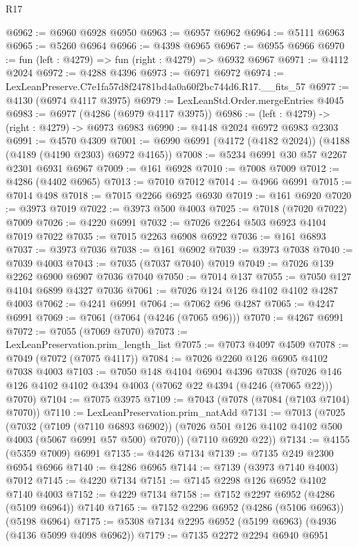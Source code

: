 \begin{lexlean}{R17}
\begin{coremodule}
@6962 := @6960 @6928 @6950
@6963 := @6957 @6962
@6964 := @5111 @6963
@6965 := @5260 @6964
@6966 := @4398 @6965
@6967 := @6955 @6966
@6970 := fun (left : @4279) => fun (right : @4279) => @6932 @6967
@6971 := @4112 @2024
@6972 := @4288 @4396
@6973 := @6971 @6972
@6974 := LexLeanPreserve.C7e1fa57d8f24781bd4a0a60f2bc744d6.R17.__fits_57
@6977 := @4130 (@6974 @4117 @3975)
@6979 := LexLeanStd.Order.mergeEntries @4045
@6983 := @6977 (@4286 (@6979 @4117 @3975))
@6986 := (left : @4279) -> (right : @4279) -> @6973 @6983
@6990 := @4148 @2024 @6972 @6983 @2303
@6991 := @4570 @4309
@7001 := @6990 @6991 (@4172 (@4182 @2024)) (@4188 (@4189 (@4190 @2303) @6972 @4165))
@7008 := @5234 @6991 @30 @57 @2267 @2301 @6931 @6967
@7009 := @161 @6928
@7010 := @7008 @7009
@7012 := @4286 (@4402 @6965)
@7013 := @7010 @7012
@7014 := @4966 @6991
@7015 := @7014 @498
@7018 := @7015 @2266 @6925 @6930
@7019 := @161 @6920
@7020 := @3973 @7019
@7022 := @3973 @500 @4003
@7025 := @7018 (@7020 @7022) @7009
@7026 := @4220 @6991
@7032 := @7026 @2264 @503 @6923 @4104 @7019 @7022
@7035 := @7015 @2263 @6908 @6922
@7036 := @161 @6893
@7037 := @3973 @7036
@7038 := @161 @6902
@7039 := @3973 @7038
@7040 := @7039 @4003
@7043 := @7035 (@7037 @7040) @7019
@7049 := @7026 @139 @2262 @6900 @6907 @7036 @7040
@7050 := @7014 @137
@7055 := @7050 @127 @4104 @6899 @4327 @7036
@7061 := @7026 @124 @126 @4102 @4102 @4287 @4003
@7062 := @4241 @6991
@7064 := @7062 @96 @4287
@7065 := @4247 @6991
@7069 := @7061 (@7064 (@4246 (@7065 @96)))
@7070 := @4267 @6991
@7072 := @7055 (@7069 @7070)
@7073 := LexLeanPreservation.prim_length_list
@7075 := @7073 @4097 @4509
@7078 := @7049 (@7072 (@7075 @4117))
@7084 := @7026 @2260 @126 @6905 @4102 @7038 @4003
@7103 := @7050
    @148
    @4104
    @6904
    @4396
    @7038
    (@7026 @146 @126 @4102 @4102 @4394 @4003 (@7062 @22 @4394 (@4246 (@7065 @22))) @7070)
@7104 := @7075 @3975
@7109 := @7043 (@7078 (@7084 (@7103 @7104) @7070))
@7110 := LexLeanPreservation.prim_natAdd
@7131 := @7013
    (@7025
      (@7032
        (@7109 (@7110 @6893 @6902))
        (@7026 @501 @126 @4102 @4102 @500 @4003 (@5067 @6991 @57 @500) @7070))
      (@7110 @6920 @22))
@7134 := @4155 (@5359 @7009) @6991
@7135 := @4426 @7134
@7139 := @7135 @249 @2300 @6954 @6966
@7140 := @4286 @6965
@7144 := @7139 (@3973 @7140 @4003) @7012
@7145 := @4220 @7134
@7151 := @7145 @2298 @126 @6952 @4102 @7140 @4003
@7152 := @4229 @7134
@7158 := @7152 @2297 @6952 (@4286 (@5109 @6964)) @7140
@7165 := @7152 @2296 @6952 (@4286 (@5106 @6963)) (@5198 @6964)
@7175 := @5308 @7134 @2295 @6952 (@5199 @6963) (@4936 (@4136 @5099 @4098 @6962))
@7179 := @7135 @2272 @2294 @6940 @6951

\end{coremodule}
\end{lexlean}
